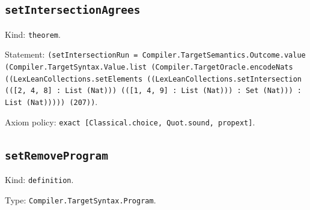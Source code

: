 \documentclass[11pt]{article}
\begin{document}
\subsection*{\texttt{setIntersectionAgrees}}
\noindent Kind: \texttt{theorem}.\par
\noindent Statement: \texttt{(setIntersectionRun = Compiler.TargetSemantics.Outcome.value (Compiler.TargetSyntax.Value.list (Compiler.TargetOracle.encodeNats ((LexLeanCollections.setElements ((LexLeanCollections.setIntersection (([2, 4, 8] : List (Nat))) (([1, 4, 9] : List (Nat))) : Set (Nat))) : List (Nat))))) (207))}.\par
\noindent Axiom policy: \texttt{exact [Classical.choice, Quot.sound, propext]}.\par
\subsection*{\texttt{setRemoveProgram}}
\noindent Kind: \texttt{definition}.\par
\noindent Type: \texttt{Compiler.TargetSyntax.Program}.\par
\end{document}
